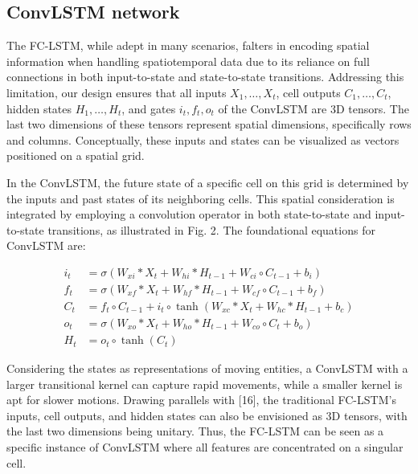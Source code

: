 \documentclass[
]{agujournal2019}
\begin{document}
\hypertarget{convlstm-network}{%
\subsection{ConvLSTM network}\label{convlstm-network}}

The FC-LSTM, while adept in many scenarios, falters in encoding spatial
information when handling spatiotemporal data due to its reliance on
full connections in both input-to-state and state-to-state transitions.
Addressing this limitation, our design ensures that all inputs
\(X_1, \ldots, X_t\), cell outputs \(C_1, \ldots, C_t\), hidden states
\(H_1, \ldots, H_t\), and gates \(i_t, f_t, o_t\) of the ConvLSTM are 3D
tensors. The last two dimensions of these tensors represent spatial
dimensions, specifically rows and columns. Conceptually, these inputs
and states can be visualized as vectors positioned on a spatial grid.

In the ConvLSTM, the future state of a specific cell on this grid is
determined by the inputs and past states of its neighboring cells. This
spatial consideration is integrated by employing a convolution operator
in both state-to-state and input-to-state transitions, as illustrated in
Fig. 2. The foundational equations for ConvLSTM are:

\[
\begin{aligned}
i_t &= \sigma(W_{xi} \ast X_t + W_{hi} \ast H_{t-1} + W_{ci} \circ C_{t-1} + b_i) \\
f_t &= \sigma(W_{xf} \ast X_t + W_{hf} \ast H_{t-1} + W_{cf} \circ C_{t-1} + b_f) \\
C_t &= f_t \circ C_{t-1} + i_t \circ \tanh(W_{xc} \ast X_t + W_{hc} \ast H_{t-1} + b_c) \\
o_t &= \sigma(W_{xo} \ast X_t + W_{ho} \ast H_{t-1} + W_{co} \circ C_t + b_o) \\
H_t &= o_t \circ \tanh(C_t)
\end{aligned}
\]

Considering the states as representations of moving entities, a ConvLSTM
with a larger transitional kernel can capture rapid movements, while a
smaller kernel is apt for slower motions. Drawing parallels with
{[}16{]}, the traditional FC-LSTM's inputs, cell outputs, and hidden
states can also be envisioned as 3D tensors, with the last two
dimensions being unitary. Thus, the FC-LSTM can be seen as a specific
instance of ConvLSTM where all features are concentrated on a singular
cell.
\end{document}
